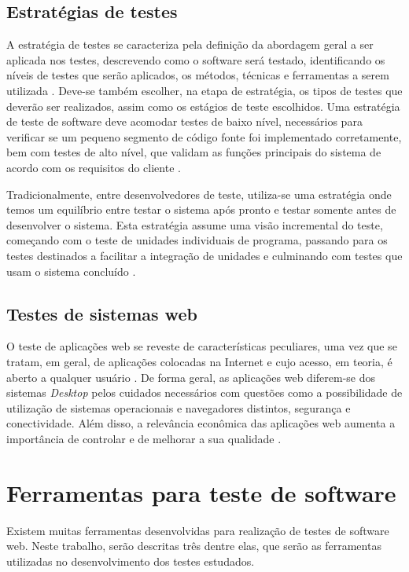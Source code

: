 \documentclass[tg]{mdtufsm}
\begin{document}
\subsection{Estratégias de testes}
A estratégia de testes se caracteriza pela definição da abordagem geral a ser aplicada nos testes, descrevendo como o software será testado, identificando os níveis de testes que serão aplicados, os métodos,
técnicas e ferramentas a serem utilizada \cite{rios2006teste}. Deve-se também escolher, na etapa de estratégia, os tipos de testes que deverão ser realizados, assim como os estágios de teste escolhidos. Uma estratégia de teste de software deve acomodar testes de baixo nível, necessários para verificar se um pequeno segmento de código fonte foi implementado corretamente, bem com testes de alto nível, que validam as funções principais do sistema de acordo com os requisitos do cliente \cite{pressman2011engenharia}.

Tradicionalmente, entre desenvolvedores de teste, utiliza-se uma estratégia onde temos um equilíbrio entre testar o sistema após pronto e testar somente antes de desenvolver o sistema. Esta estratégia assume uma visão incremental do teste, começando com o teste de unidades individuais de programa, passando para os testes destinados a facilitar a integração de unidades e culminando com testes que usam o sistema concluído \cite{pressman2011engenharia}.

\subsection{Testes de sistemas web}
O teste de aplicações web se reveste de características peculiares, uma vez que se tratam, em geral, de aplicações colocadas na Internet e cujo acesso, em teoria,
é aberto a qualquer usuário \cite{rios2006teste}.  De forma geral, as aplicações web diferem-se dos sistemas \emph{Desktop} pelos cuidados necessários com questões como a
possibilidade de utilização de sistemas operacionais e navegadores distintos, segurança e conectividade. Além disso, a relevância econômica das aplicações web aumenta a
importância de controlar e de melhorar a sua qualidade \cite{fidelis2004fireweb}.


\section{Ferramentas para teste de software}
Existem muitas ferramentas desenvolvidas para realização de testes de software web. Neste trabalho, serão descritas três dentre elas, que serão as ferramentas utilizadas no desenvolvimento dos testes estudados.
\end{document}
